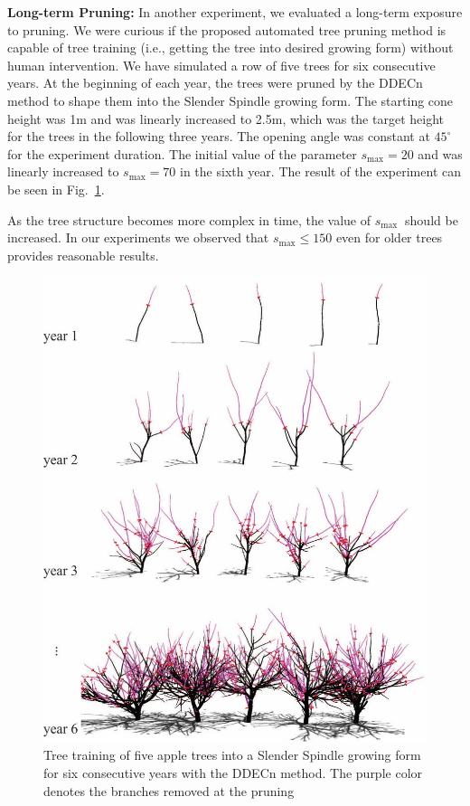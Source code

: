 \noindent\textbf{Long-term Pruning:} In another experiment, we evaluated a
long-term exposure to pruning. We were curious if the proposed automated tree pruning method is capable of tree training (i.e., getting the tree into desired growing form) without human intervention. We have
simulated a row of five trees for six consecutive years. At the
beginning of each year, the trees were pruned by the DDECn method to shape
them into the Slender Spindle growing form. The starting cone height was
1m and was linearly increased to 2.5m, which was the target height for
the trees in the following three years. The opening angle was constant
at $45^\circ$ for the experiment duration. The initial value of the parameter
\(s_{\mathrm{\max}}=20\) and was linearly increased to \(s_{\mathrm{\max}}=70\) in
the sixth year. The result of the experiment can be seen in Fig.~\ref{fig:my_figure7}.

As the tree structure becomes more complex in time, the
value of \(s_{\mathrm{\max}}\ \) should be increased. In our experiments
we observed that \(s_{\mathrm{\max}}\leq{150}\) even
for older trees provides reasonable results.
\begin{figure}[hbt]
    \centering
    \includegraphics[width=0.8\linewidth]{figs/image7.jpeg}
    \caption{Tree training of five apple trees into a Slender
Spindle growing form for six consecutive years with the DDECn method.
The purple color denotes the branches removed at the pruning}
    \label{fig:my_figure7}
\end{figure}


